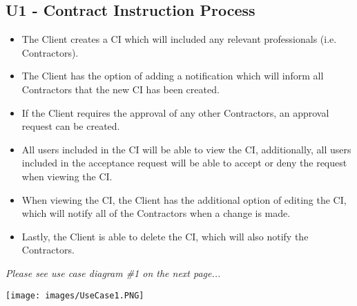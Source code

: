\documentclass[11pt]{article}
\begin{document}
\subsection{U1 - Contract Instruction Process}
    \begin{flushleft}
        \begin{itemize}
            \item The Client creates a CI which will included any relevant professionals (i.e. Contractors).\\[0.5cm]
            \item The Client has the option of adding a notification which will inform all Contractors that the new CI has been created.\\[0.5cm]
            \item If the Client requires the approval of any other Contractors, an approval request can be created.\\[0.5cm]
            \item All users included in the CI will be able to view the CI, additionally, all users included in the acceptance request will be able to accept or deny the request when viewing the CI.\\[0.5cm]
            \item When viewing the CI, the Client has the additional option of editing the CI, which will notify all of the Contractors when a change is made.\\[0.5cm]
            \item Lastly, the Client is able to delete the CI, which will also notify the Contractors.\\[0.5cm]
        \end{itemize}
    \textit{Please see use case diagram \#1 on the next page...}\\[0.5cm]
\end{flushleft}
\texttt{[image: images/UseCase1.PNG]}
\end{document}
